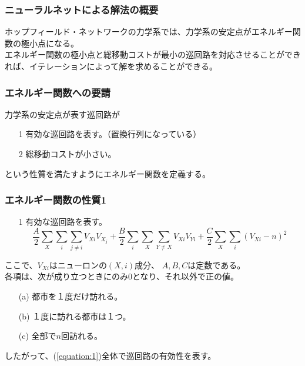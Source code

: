 \documentclass[dvipdfmx,11pt,notheorems]{beamer}
\theoremstyle{definition}
\begin{document}
\begin{frame}\frametitle{ニューラルネットによる解法の概要}
ホップフィールド・ネットワークの力学系では、力学系の安定点がエネルギー関数の極小点になる。\\
\vspace{1cm}
エネルギー関数の極小点と総移動コストが最小の巡回路を対応させることができれば、イテレーションによって解を求めることができる。
\end{frame}

\begin{frame}\frametitle{エネルギー関数への要請}
力学系の安定点が表す巡回路が
\vspace{0.5cm}
\begin{enumerate}
\item[1] 有効な巡回路を表す。（置換行列になっている）
\item[2] 総移動コストが小さい。
\end{enumerate}
\vspace{0.5cm}
という性質を満たすようにエネルギー関数を定義する。
\end{frame}

\begin{frame}\frametitle{エネルギー関数の性質1}
\begin{enumerate}
\item[1] 有効な巡回路を表す。 \\
\begin{equation}
	\label{equation:1}
	\displaystyle \frac{A}{2}\sum_{X}\sum_{i}\sum_{j \neq i} V_{Xi}V_{X_{j}}
    + \frac{B}{2}\sum_{i}\sum_{X}\sum_{Y \neq X} V_{Xi}V_{Yi}
    + \frac{C}{2}\sum_{X}\sum_{i}(V_{Xi} - n)^2    
\end{equation}
\end{enumerate}
ここで、$V_{Xi}$はニューロンの$(X, i)$成分、 $A, B, C$は定数である。 \\
\vspace{0.5cm}
各項は、次が成り立つときにのみ$0$となり、それ以外で正の値。
\begin{enumerate}
\item[(a)] 都市を１度だけ訪れる。
\item[(b)] １度に訪れる都市は１つ。
\item[(c)] 全部で$n$回訪れる。
\end{enumerate}
\vspace{0.5cm}
\large{
したがって、(\ref{equation:1})全体で巡回路の有効性を表す。
}
\end{frame}
\end{document}
